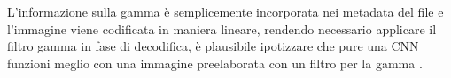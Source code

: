 L'informazione sulla gamma è semplicemente incorporata nei metadata del file e l'immagine viene codificata in maniera lineare, rendendo necessario applicare il filtro gamma in fase di decodifica, è plausibile ipotizzare che pure una CNN funzioni meglio con una immagine preelaborata con un filtro per la gamma \cite{gamma} \cite{gonzalez_dip}.




